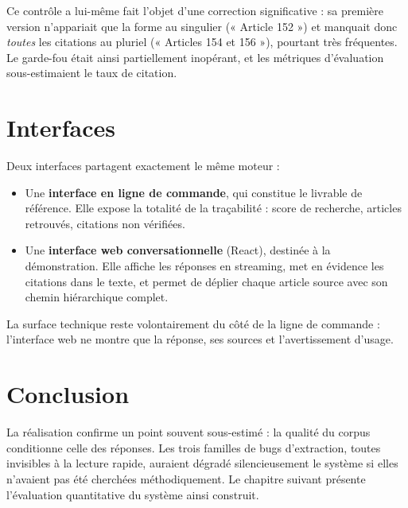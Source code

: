 Ce contrôle a lui-même fait l'objet d'une correction significative : sa première version
n'appariait que la forme au singulier (« Article 152 ») et manquait donc \emph{toutes} les
citations au pluriel (« Articles 154 et 156 »), pourtant très fréquentes. Le garde-fou était
ainsi partiellement inopérant, et les métriques d'évaluation sous-estimaient le taux de citation.

\section{Interfaces}

Deux interfaces partagent exactement le même moteur :

\begin{itemize}
    \item Une \textbf{interface en ligne de commande}, qui constitue le livrable de référence.
    Elle expose la totalité de la traçabilité : score de recherche, articles retrouvés, citations
    non vérifiées.
    \item Une \textbf{interface web conversationnelle} (React), destinée à la démonstration.
    Elle affiche les réponses en streaming, met en évidence les citations dans le texte, et
    permet de déplier chaque article source avec son chemin hiérarchique complet.
\end{itemize}

La surface technique reste volontairement du côté de la ligne de commande : l'interface web ne
montre que la réponse, ses sources et l'avertissement d'usage.

\newpage
\section*{Conclusion}

La réalisation confirme un point souvent sous-estimé : la qualité du corpus conditionne celle des
réponses. Les trois familles de bugs d'extraction, toutes invisibles à la lecture rapide, auraient
dégradé silencieusement le système si elles n'avaient pas été cherchées méthodiquement. Le
chapitre suivant présente l'évaluation quantitative du système ainsi construit.
